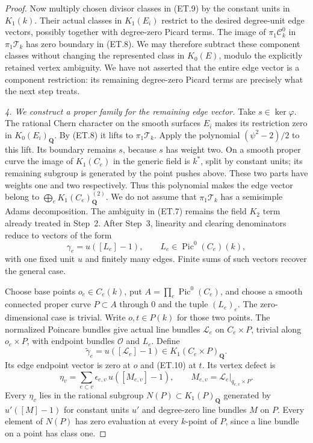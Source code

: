 \begin{proof}
Now multiply chosen divisor classes in (ET.9) by the constant units
in $K_1(k)$. Their actual classes in $K_1(E_i)$ restrict to the desired
degree-unit edge vectors, possibly together with degree-zero Picard
terms. The image of $\pi_1\mathcal C_k^0$ in
$\pi_1\mathcal T_k$ has zero boundary in (ET.8). We may therefore
subtract these component classes without changing the represented
class in $K_0(E)$, modulo the explicitly retained vertex ambiguity.
We have not asserted that the entire edge vector is a component
restriction: its remaining degree-zero Picard terms are precisely
what the next step treats.

\emph{4. We construct a proper family for the remaining edge vector.}
Take $s\in\ker\varphi$. The rational Chern character on the smooth
surfaces $E_i$ makes its restriction zero in $K_0(E_i)_{\mathbf Q}$.
By (ET.8) it lifts to $\pi_1\mathcal T_k$. Apply the polynomial
$(\psi^2-2)/2$ to this lift. Its boundary remains $s$, because $s$
has weight two. On a smooth proper curve the image of $K_1(C_e)$
in the generic field is $k^*$, split by constant units; its remaining
subgroup is generated by the point pushes above. These two parts have
weights one and two respectively. Thus this polynomial makes the edge
vector belong to $\bigoplus_eK_1(C_e)_{\mathbf Q}^{(2)}$.
We do not assume that $\pi_1\mathcal T_k$ has a semisimple Adams
decomposition. The ambiguity in (ET.7) remains the field $K_2$ term
already treated in Step~2.
After Step~3, linearity and clearing denominators reduce to vectors
of the form
\begin{equation}
               \gamma_e=u([L_e]-1),\qquad
                 L_e\in\operatorname{Pic}^0(C_e)(k),    \tag{ET.10}
\end{equation}
with one fixed unit $u$ and finitely many edges. Finite sums of such
vectors recover the general case.

Choose base points $o_e\in C_e(k)$, put $A=\prod_e\operatorname{Pic}^0(C_e)$,
and choose a smooth connected proper curve $P\subset A$ through $0$
and the tuple $(L_e)_e$. The zero-dimensional case is trivial.
Write $o,t\in P(k)$ for those two points. The normalized Poincare
bundles give actual line bundles $\mathcal L_e$ on $C_e\times P$,
trivial along $o_e\times P$, with endpoint bundles $\mathcal O$ and
$L_e$. Define
\[
       \widetilde\gamma_e=u([\mathcal L_e]-1)
                       \in K_1(C_e\times P)_{\mathbf Q}.
\]
Its edge endpoint vector is zero at $o$ and (ET.10) at $t$.
Its vertex defect is
\begin{equation}
 \eta_v=\sum_{e\subset v}\epsilon_{e,v}\,
             u([M_{e,v}]-1),\qquad
 M_{e,v}=\mathcal L_e|_{q_{e,v}\times P}.                \tag{ET.11}
\end{equation}
Every $\eta_v$ lies in the rational subgroup $N(P)\subset K_1(P)_{\mathbf Q}$
generated by $u'([M]-1)$ for constant units $u'$ and degree-zero line
bundles $M$ on $P$. Every element of $N(P)$ has zero evaluation at
every $k$-point of $P$, since a line bundle on a point has class one.


\end{proof}
